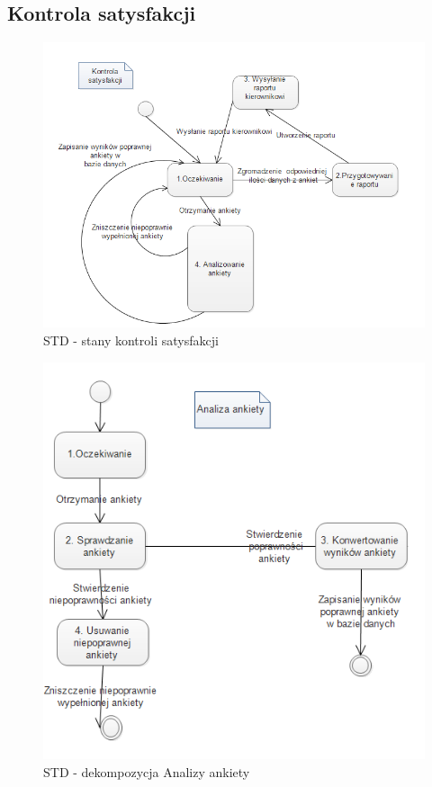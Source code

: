 \documentclass[a4paper, 11pt]{article}
\begin{document}
		\subsection{Kontrola satysfakcji}
		\indent
	\begin{figure}[H]%
			\includegraphics[scale=1.0]{Img/STD-ankieta.png}
			\caption{STD - stany kontroli satysfakcji}
	\end{figure}
		\begin{figure}[H]%
			\includegraphics[scale=1.0]{Img/STD-ankieta2.png}
			\caption{STD - dekompozycja Analizy ankiety}
		\end{figure}
		
\end{document}
